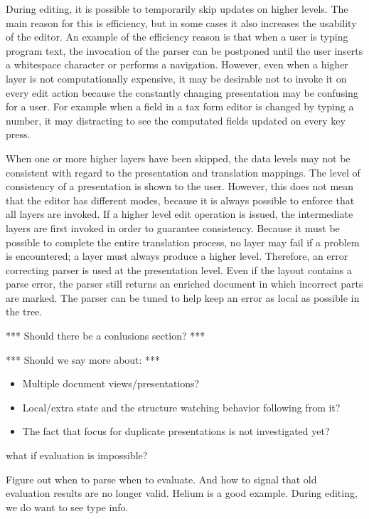 During editing, it is possible to temporarily skip updates on higher levels. The main reason for this is efficiency, but in some cases it also increases the usability of the editor. An example of the efficiency reason is that when a user is typing program text, the invocation of the parser can be postponed until the user inserts a whitespace character or performs a navigation. However, even when a higher layer is not computationally expensive, it may be desirable not to invoke it on every edit action because the constantly changing presentation may be confusing for a user. For example when a field in a tax form editor is changed by typing a number, it may distracting to see the computated fields updated on every key press.

When one or more higher layers have been skipped, the data levels may not be consistent with regard to the presentation and translation mappings. The level of consistency of a presentation is shown to the user. However, this does not mean that the editor has different modes, because it is always possible to enforce that all layers are invoked. If a higher level edit operation is issued, the intermediate layers are first invoked in order to guarantee consistency. Because it must be possible to complete the entire translation process, no layer may fail if a problem is encountered; a layer must always produce a higher level. Therefore, an error correcting parser is used at the presentation level. Even if the layout contains a parse error, the parser still returns an enriched document in which incorrect parts are marked. The parser can be tuned to help keep an error as local as possible in the tree.

 

*** Should there be a conlusions section? ***

*** Should we say more about: ***
\begin{itemize}
\item Multiple document views/presentations?
\item Local/extra state and the structure watching behavior following from it?
\item The fact that focus for duplicate presentations is not investigated yet?
\end{itemize}


\bc
what if evaluation is impossible?

Figure out when to parse when to evaluate. And how to signal that old evaluation results are no longer valid. Helium is a good example. During editing, we do want to see type info.

